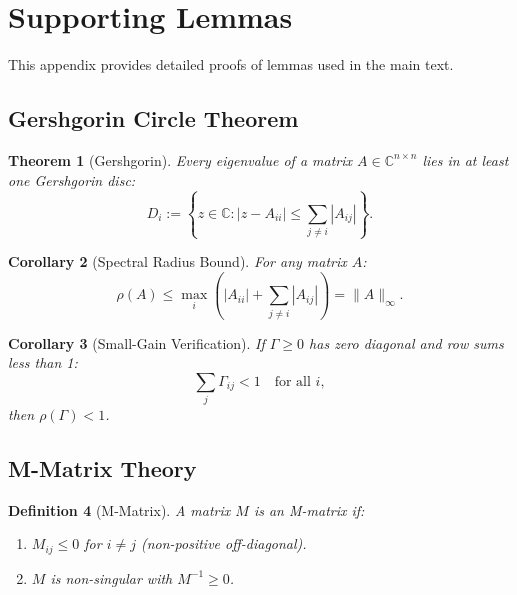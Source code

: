 \documentclass[12pt]{article}
\newtheorem{theorem}{Theorem}[section]
\newtheorem{corollary}[theorem]{Corollary}
\newtheorem{definition}[theorem]{Definition}
\newcommand{\C}{\mathbb{C}}
\begin{document}

\section{Supporting Lemmas}
\label{app:lemmas}

This appendix provides detailed proofs of lemmas used in the main text.

\subsection{Gershgorin Circle Theorem}

\begin{theorem}[Gershgorin]
\label{thm:gershgorin}
Every eigenvalue of a matrix $A \in \C^{n \times n}$ lies in at least one Gershgorin disc:
\[
D_i := \left\{ z \in \C : |z - A_{ii}| \leq \sum_{j \neq i} |A_{ij}| \right\}.
\]
\end{theorem}

\begin{corollary}[Spectral Radius Bound]
\label{cor:spectral-radius}
For any matrix $A$:
\[
\rho(A) \leq \max_i \left( |A_{ii}| + \sum_{j \neq i} |A_{ij}| \right) = \|A\|_\infty.
\]
\end{corollary}

\begin{corollary}[Small-Gain Verification]
\label{cor:small-gain}
If $\Gamma \geq 0$ has zero diagonal and row sums less than 1:
\[
\sum_{j} \Gamma_{ij} < 1 \quad \text{for all } i,
\]
then $\rho(\Gamma) < 1$.
\end{corollary}

\subsection{M-Matrix Theory}

\begin{definition}[M-Matrix]
A matrix $M$ is an \emph{M-matrix} if:
\begin{enumerate}
    \item $M_{ij} \leq 0$ for $i \neq j$ (non-positive off-diagonal).
    \item $M$ is non-singular with $M^{-1} \geq 0$.
\end{enumerate}
\end{definition}
\end{document}

